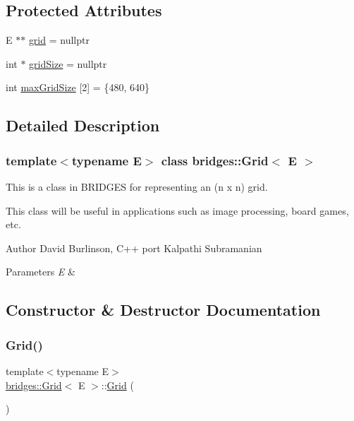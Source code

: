 \subsection*{Protected Attributes}
\begin{DoxyCompactItemize}
\item 
E $\ast$$\ast$ \mbox{\hyperlink{classbridges_1_1_grid_aea6c38498d477f09dc03906ee6fb6e19}{grid}} = nullptr
\item 
int $\ast$ \mbox{\hyperlink{classbridges_1_1_grid_ae87f0cf8ad2ea108f65561901f396d5c}{grid\+Size}} = nullptr
\item 
int \mbox{\hyperlink{classbridges_1_1_grid_a800909a94e0affac82da79cf3e6d03e5}{max\+Grid\+Size}} \mbox{[}2\mbox{]} = \{480, 640\}
\end{DoxyCompactItemize}


\subsection{Detailed Description}
\subsubsection*{template$<$typename E$>$\newline
class bridges\+::\+Grid$<$ E $>$}

This is a class in B\+R\+I\+D\+G\+ES for representing an (n x n) grid. 

This class will be useful in applications such as image processing, board games, etc.

\begin{DoxyAuthor}{Author}
David Burlinson, C++ port Kalpathi Subramanian
\end{DoxyAuthor}

\begin{DoxyParams}{Parameters}
{\em E} & \\
\hline
\end{DoxyParams}


\subsection{Constructor \& Destructor Documentation}
\mbox{\label{classbridges_1_1_grid_a711e05a933c2a11c9e2775c74e6cf80d}} 
\subsubsection{\texorpdfstring{Grid()}{Grid()}\hspace{0.1cm}{\footnotesize\ttfamily [1/3]}}
{\footnotesize\ttfamily template$<$typename E$>$ \\
\mbox{\hyperlink{classbridges_1_1_grid}{bridges\+::\+Grid}}$<$ E $>$\+::\mbox{\hyperlink{classbridges_1_1_grid}{Grid}} (\begin{DoxyParamCaption}{ }\end{DoxyParamCaption})\hspace{0.3cm}{\ttfamily [inline]}}


